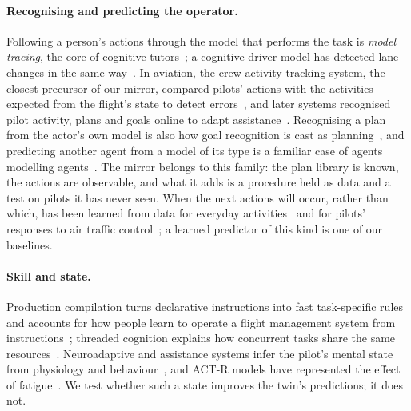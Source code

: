 \documentclass{llncs}
\begin{document}
\paragraph{Recognising and predicting the operator.} Following a person's actions through the model that performs the task is
\emph{model tracing}, the core of cognitive tutors~\cite{anderson_cognitive_tutors_1995}; a cognitive driver model has detected lane
changes in the same way~\cite{salvucci_lane_change_2007}. In aviation, the crew activity tracking system, the closest precursor of our
mirror, compared pilots' actions with the activities expected from the flight's state to detect errors~\cite{callantine_cats_2001}, and
later systems recognised pilot activity, plans and goals
online to adapt assistance~\cite{honecker_pilot_activity_2017,kunzel_plan_goal_2024}. Recognising a plan from the actor's own model is
also how goal recognition is cast as planning~\cite{meneguzzi_goal_recognition_2021}, and predicting another agent from a model of its
type is a familiar case of agents modelling agents~\cite{albrecht_modelling_agents_2018}. The mirror belongs to this family: the plan
library is known, the actions are observable, and what it adds is a procedure held as data and a test on pilots it has never seen. When
the next actions will occur, rather than which, has been learned from data for everyday activities~\cite{abu_farha_anticipating_2018}
and for pilots' responses to air traffic control~\cite{wustenbecker_response_time_2026}; a learned predictor of this kind is one of our
baselines.

\paragraph{Skill and state.} Production compilation turns declarative instructions into fast task-specific rules~\cite{taatgen_lee_2003}
and accounts for how people learn to operate a flight management system from instructions~\cite{taatgen_robust_2008}; threaded
cognition explains how concurrent tasks share the same resources~\cite{salvucci_threaded_2008}. Neuroadaptive and assistance systems
infer the pilot's mental state from physiology and behaviour~\cite{klaproth_neuroadaptive_2020,russwinkel_cognitive_assistance_2020},
and ACT-R models have represented the effect of fatigue~\cite{gunzelmann_sleep_deprivation_2009}. We test whether such a state improves
the twin's predictions; it does not.
\end{document}
